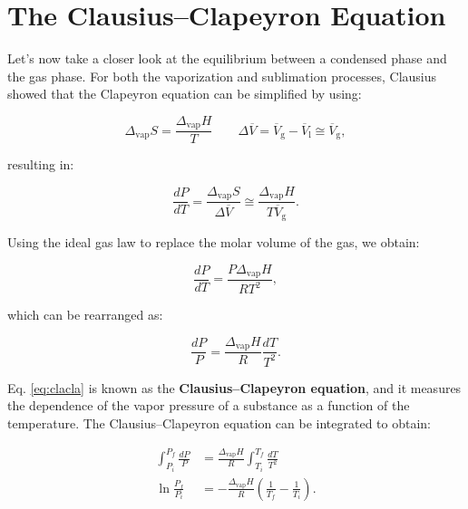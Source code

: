 \documentclass[
  9pt,
]{extbook}
\theoremstyle{definition}
\theoremstyle{definition}
\theoremstyle{definition}
\theoremstyle{remark}
\begin{document}
\hypertarget{the-clausiusclapeyron-equation}{%
\section{The Clausius--Clapeyron Equation}\label{the-clausiusclapeyron-equation}}

Let's now take a closer look at the equilibrium between a condensed phase and the gas phase. For both the vaporization and sublimation processes, Clausius showed that the Clapeyron equation can be simplified by using:

\begin{equation}
 \Delta_{\text{vap}} S = \frac{\Delta_{\text{vap}} H}{T} \qquad \Delta \overline{V}= \overline{V}_{\mathrm{g}} -\overline{V}_{\mathrm{l}} \cong \overline{V}_{\mathrm{g}},
\label{eq:clacla1}
\end{equation}

resulting in:

\begin{equation}
 \frac{dP}{dT} = \frac{ \Delta_{\text{vap}} S}{\Delta \overline{V}} \cong \frac{ \Delta_{\text{vap}} H}{T \overline{V}_{\mathrm{g}}}.
\label{eq:clacla2}
\end{equation}

Using the ideal gas law to replace the molar volume of the gas, we obtain:

\begin{equation}
 \frac{dP}{dT} = \frac{P \Delta_{\text{vap}} H}{RT^2},
\label{eq:clacla3}
\end{equation}

which can be rearranged as:

\begin{equation}
 \frac{dP}{P} = \frac{\Delta_{\text{vap}} H}{R} \frac{dT}{T^2}.
\label{eq:clacla}
\end{equation}

Eq. \eqref{eq:clacla} is known as the \textbf{Clausius--Clapeyron equation}, and it measures the dependence of the vapor pressure of a substance as a function of the temperature. The Clausius--Clapeyron equation can be integrated to obtain:

\begin{equation}
\begin{aligned}
\int_{P_i}^{P_f} \frac{dP}{P} &= \frac{\Delta_{\text{vap}} H}{R} \int_{T_i}^{T_f} \frac{dT}{T^2} \\
\ln \frac{P_f}{P_i} &=-\frac{\Delta_{\text{vap}} H}{R} \left( \frac{1}{T_f}-\frac{1}{T_i} \right).
\end{aligned}
\label{eq:clacla4}
\end{equation}
\end{document}
